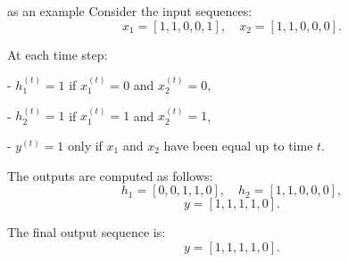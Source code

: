 \begin{qsolve}
\begin{qsolve}[]
as an example Consider the input sequences:
\[
x_1 = [1, 1, 0, 0, 1], \quad x_2 = [1, 1, 0, 0, 0].
\]

At each time step:

- \( h_1^{(t)} = 1 \) if \( x_1^{(t)} = 0 \) and \( x_2^{(t)} = 0 \),

- \( h_2^{(t)} = 1 \) if \( x_1^{(t)} = 1 \) and \( x_2^{(t)} = 1 \),

- \( y^{(t)} = 1 \) only if \( x_1 \) and \( x_2 \) have been equal up to time \( t \).

The outputs are computed as follows:
\[
h_1 = [0, 0, 1, 1, 0], \quad h_2 = [1, 1, 0, 0, 0],
\]
\[
y = [1, 1, 1, 1, 0].
\]

The final output sequence is:
\[
y = [1, 1, 1, 1, 0].
\]
	\end{qsolve}
\end{qsolve}